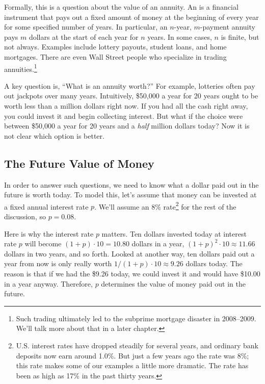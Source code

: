 Formally, this is a question about the value of an annuity.  An
 is a financial instrument that pays out a fixed amount
of money at the beginning of every year for some specified number of
years.  In particular, an $n$-year, $m$-payment annuity pays $m$
dollars at the start of each year for $n$ years.  In some cases, $n$
is finite, but not always.  Examples include lottery payouts, student
loans, and home mortgages.  There are even Wall Street people who
specialize in trading annuities.\footnote{Such trading ultimately led
  to the subprime mortgage disaster in 2008--2009.  We'll talk more
  about that in a later chapter.} 

A key question is, ``What is an annuity worth?''  For example,
lotteries often pay out jackpots over many years.  Intuitively,
\$50,000 a year for 20 years ought to be worth less than a million
dollars right now.  If you had all the cash right away, you could
invest it and begin collecting interest.  But what if the choice were
between \$50,000 a year for 20 years and a \emph{half} million
dollars today?  Now it is not clear which option is better.

\subsection{The Future Value of Money}

In order to answer such questions, we need to know what a dollar paid
out in the future is worth today.  To model this, let's assume that
money can be invested at a fixed annual interest rate $p$.  We'll
assume an 8\% rate\footnote{U.S. interest rates have dropped steadily
  for several years, and ordinary bank deposits now earn around 1.0\%.
  But just a few years ago the rate was 8\%; this rate makes some of
  our examples a little more dramatic.  The rate has been as high as
  17\% in the past thirty years.} for the rest of the discussion, so
$p = 0.08$.

Here is why the interest rate $p$ matters.  Ten dollars invested today
at interest rate $p$ will become $(1+p)\cdot 10 = 10.80$ dollars in a
year, $(1+p)^2\cdot 10 \approx 11.66$ dollars in two years, and so
forth.  Looked at another way, ten dollars paid out a year from now is
only really worth $1/(1+p) \cdot 10 \approx 9.26$ dollars today.  The
reason is that if we had the \$9.26 today, we could invest it and
would have \$10.00 in a year anyway.  Therefore, $p$ determines the
value of money paid out in the future.

